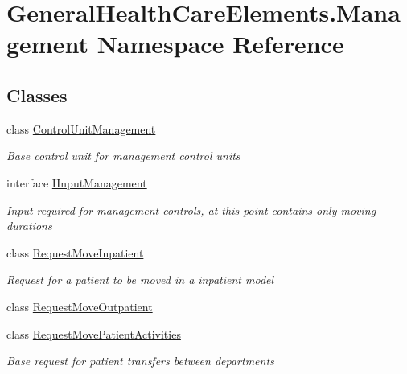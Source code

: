 \hypertarget{namespace_general_health_care_elements_1_1_management}{}\section{General\+Health\+Care\+Elements.\+Management Namespace Reference}
\label{namespace_general_health_care_elements_1_1_management}
\subsection*{Classes}
\begin{DoxyCompactItemize}
\item 
class \hyperlink{class_general_health_care_elements_1_1_management_1_1_control_unit_management}{Control\+Unit\+Management}
\begin{DoxyCompactList}\small\item\em Base control unit for management control units \end{DoxyCompactList}\item 
interface \hyperlink{interface_general_health_care_elements_1_1_management_1_1_i_input_management}{I\+Input\+Management}
\begin{DoxyCompactList}\small\item\em \hyperlink{namespace_general_health_care_elements_1_1_input}{Input} required for management controls, at this point contains only moving durations \end{DoxyCompactList}\item 
class \hyperlink{class_general_health_care_elements_1_1_management_1_1_request_move_inpatient}{Request\+Move\+Inpatient}
\begin{DoxyCompactList}\small\item\em Request for a patient to be moved in a inpatient model \end{DoxyCompactList}\item 
class \hyperlink{class_general_health_care_elements_1_1_management_1_1_request_move_outpatient}{Request\+Move\+Outpatient}
\item 
class \hyperlink{class_general_health_care_elements_1_1_management_1_1_request_move_patient_activities}{Request\+Move\+Patient\+Activities}
\begin{DoxyCompactList}\small\item\em Base request for patient transfers between departments \end{DoxyCompactList}\end{DoxyCompactItemize}
